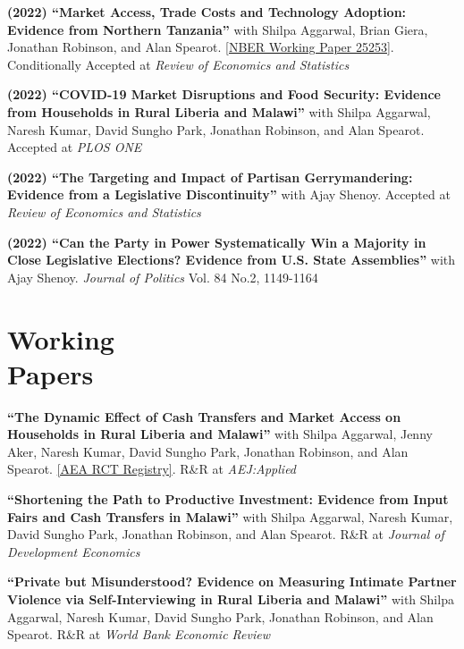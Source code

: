 \documentclass[letterpaper, margin, 10pt]{res} %
\begin{document}
\begin{resume}
\normalsize
{\bf (2022) ``{Market Access, Trade Costs and Technology Adoption: Evidence from Northern Tanzania}''} with Shilpa Aggarwal, Brian Giera, Jonathan Robinson, and Alan Spearot. \href{https://www.nber.org/papers/w25253.pdf}{[NBER Working Paper 25253]}. Conditionally Accepted at \textit{Review of Economics and Statistics}

{\bf (2022) ``COVID-19 Market Disruptions and Food Security: Evidence from Households in Rural Liberia and Malawi''} with Shilpa Aggarwal, Naresh Kumar, David Sungho Park, Jonathan Robinson, and Alan Spearot. Accepted at \textit{PLOS ONE}

\normalsize
{\bf (2022) ``{The Targeting and Impact of Partisan Gerrymandering: Evidence from a Legislative Discontinuity}''} with Ajay Shenoy. Accepted at \textit{Review of Economics and Statistics} 

\normalsize 
{\bf  (2022) ``{Can the Party in Power Systematically Win a Majority in Close Legislative Elections? Evidence from U.S. State Assemblies}''} with Ajay Shenoy. \textit{Journal of Politics} Vol. 84 No.2, 1149-1164



\normalsize\section{\textbf{Working \\ Papers}}

\normalsize 


\normalsize 

{\bf ``{The Dynamic Effect of Cash Transfers and Market Access on Households in Rural Liberia and Malawi}''}
with Shilpa Aggarwal, Jenny Aker, Naresh Kumar, David Sungho Park, Jonathan Robinson, and Alan Spearot. \href{https://www.socialscienceregistry.org/trials/4869}{{[AEA RCT Registry]}}. R\&R at \textit{AEJ:Applied} 

{\bf ``{Shortening the Path to Productive Investment: Evidence from Input Fairs and Cash Transfers in Malawi}''}
with Shilpa Aggarwal, Naresh Kumar, David Sungho Park, Jonathan Robinson, and Alan Spearot. R\&R at \textit{Journal of Development Economics}



{\bf ``Private but Misunderstood? Evidence on Measuring Intimate Partner Violence via Self-Interviewing in Rural Liberia and Malawi''}
with Shilpa Aggarwal, Naresh Kumar, David Sungho Park, Jonathan Robinson, and Alan Spearot. R\&R at \textit{World Bank Economic Review}




\end{resume}
\end{document}
